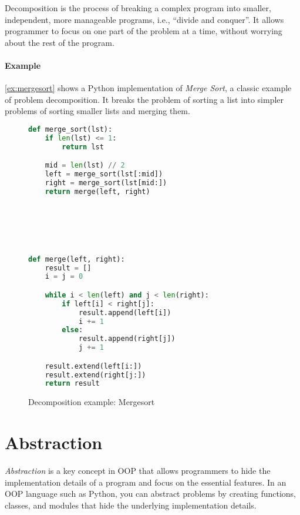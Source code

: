 \documentclass[oneside,11pt,dvipsnames]{book}
\begin{document}

Decomposition is the process of breaking a complex program into smaller, independent, more manageable programs, i.e., ``divide and conquer''. It allows programmer to focus on one part of the problem at a time, without worrying about the rest of the program.

\paragraph{Example} \autoref{ex:mergesort} shows a Python implementation of \emph{Merge Sort}, a classic example of problem decomposition. It breaks the problem of sorting a list into simpler problems of sorting smaller lists and merging them.

\begin{figure}[t]
\begin{lstlisting}[multicols=2, language=Python, keywordstyle=\color{blue}, commentstyle=\color{green!60!black}, stringstyle=\color{red}, basicstyle=\ttfamily\scriptsize]
def merge_sort(lst):
    if len(lst) <= 1:
        return lst

    mid = len(lst) // 2
    left = merge_sort(lst[:mid])
    right = merge_sort(lst[mid:])
    return merge(left, right)






def merge(left, right):
    result = []
    i = j = 0

    while i < len(left) and j < len(right):
        if left[i] < right[j]:
            result.append(left[i])
            i += 1
        else:
            result.append(right[j])
            j += 1

    result.extend(left[i:])
    result.extend(right[j:])
    return result
\end{lstlisting}
 \caption{Decomposition example: Mergesort}\label{ex:mergesort}
\end{figure}


\section{Abstraction}\label{sec:abstraction}
\emph{Abstraction} is a key concept in OOP that allows programmers to hide the implementation details of a program and focus on the essential features.
In an OOP language such as Python, you can abstract problems by creating functions, classes, and modules that hide the underlying implementation details.
\end{document}
